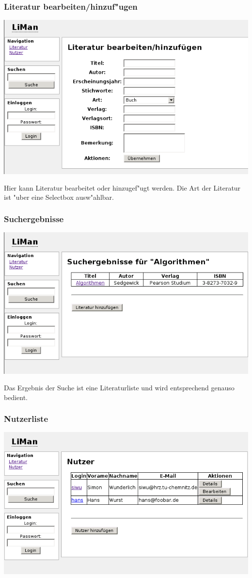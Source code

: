 \subsubsection{Literatur bearbeiten/hinzuf"ugen}
\includegraphics[scale=0.6]{litmod.png}

Hier kann Literatur bearbeitet oder hinzugef"ugt werden. Die Art der Literatur ist "uber eine Selectbox ausw"ahlbar.

\subsubsection{Suchergebnisse}
\includegraphics[scale=0.6]{search.png}

Das Ergebnis der Suche ist eine Literaturliste und wird entsprechend genauso bedient.

\subsubsection{Nutzerliste}
\includegraphics[scale=0.6]{user.png}

